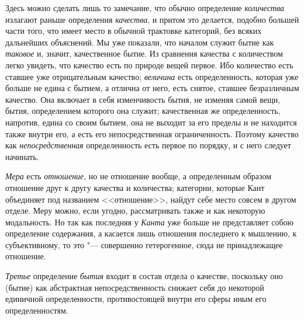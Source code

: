 Здесь можно сделать лишь то замечание, что обычно определение
{\em количества} излагают раньше определения
{\em качества}, и притом это делается, подобно большей
части того, что имеет место в обычной трактовке категорий, без всяких
дальнейших объяснений. Мы уже показали, что началом служит бытие как
{\em таковое} и, значит, качественное бытие. Из
сравнения качества с количеством легко увидеть, что качество есть по
природе вещей первое. Ибо количество есть ставшее уже отрицательным
качество; {\em величина} есть определенность, которая
уже больше не едина с бытием, а отлична от него, есть снятое, ставшее
безразличным качество. Она включает в себя изменчивость бытия, не изменяя
самой вещи, бытия, определением которого она служит; качественная же
определенность, напротив, едина со своим бытием, она не выходит за его
пределы и не находится также внутри его, а есть его непосредственная
ограниченность. Поэтому качество как
{\em непосредственная} определенность есть первое по
порядку, и с него следует начинать.

{\em Мера} есть {\em отношение}, но
не отношение вообще, а определенным образом отношение друг к другу качества
и количества; категории, которые Кант объединяет под названием <<отношение>>,
найдут себе место совсем в другом отделе.
Меру можно, если угодно, рассматривать также и как некоторую модальность. Но
так как последняя у {\em Канта} уже больше не
представляет собою определение содержания, а касается лишь отношения
последнего к мышлению, к субъективному, то это "--- совершенно гетерогенное,
сюда не принадлежащее отношение.

{\em Третье} определение {\em бытия} входит в состав отдела о
качестве, поскольку оно (бытие) как абстрактная непосредственность снижает
себя до некоторой единичной определенности, противостоящей внутри его сферы
иным его определенностям.

\bigskip
